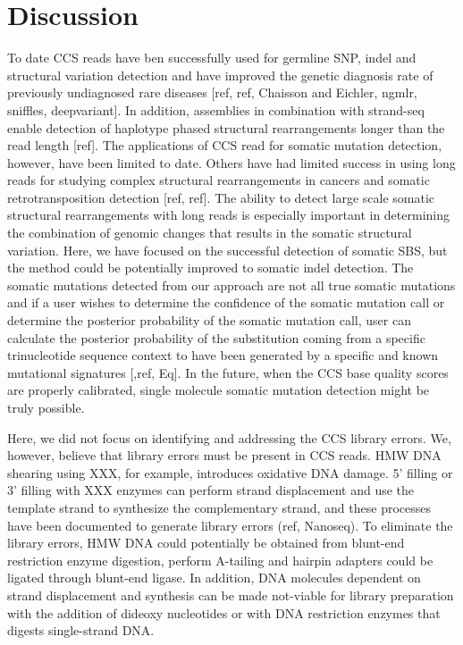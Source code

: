 \section{Discussion}

To date CCS reads have ben successfully used for germline SNP, indel and structural variation detection and have improved the genetic diagnosis rate of previously undiagnosed rare diseases [ref, ref, Chaisson and Eichler, ngmlr, sniffles, deepvariant]. In addition, assemblies in combination with strand-seq enable detection of haplotype phased structural rearrangements longer than the read length [ref]. The applications of CCS read for somatic mutation detection, however, have been limited to date. Others have had limited success in using long reads for studying complex structural rearrangements in cancers and somatic retrotransposition detection [ref, ref]. The ability to detect large scale somatic structural rearrangements with long reads is especially important in determining the combination of genomic changes that results in the somatic structural variation. Here, we have focused on the successful detection of somatic SBS, but the method could be potentially improved to somatic indel detection. The somatic mutations detected from our approach are not all true somatic mutations and if a user wishes to determine the confidence of the somatic mutation call or determine the posterior probability of the somatic mutation call, user can calculate the posterior probability of the substitution coming from a specific trinucleotide sequence context to have been generated by a specific and known mutational signatures [,ref, Eq]. In the future, when the CCS base quality scores are properly calibrated, single molecule somatic mutation detection might be truly possible.

Here, we did not focus on identifying and addressing the CCS library errors. We, however, believe that library errors must be present in CCS reads. HMW DNA shearing using XXX, for example, introduces oxidative DNA damage. 5’ filling or 3’ filling with XXX enzymes can perform strand displacement and use the template strand to synthesize the complementary strand, and these processes have been documented to generate library errors (ref, Nanoseq). To eliminate the library errors, HMW DNA could potentially be obtained from blunt-end restriction enzyme digestion, perform A-tailing and hairpin adapters could be ligated through blunt-end ligase. In addition, DNA molecules dependent on strand displacement and synthesis can be made not-viable for library preparation with the addition of dideoxy nucleotides or with DNA restriction enzymes that digests single-strand DNA. 

